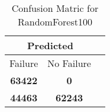 \begin{table}[] 
\caption{Confusion Matric for RandomForest100} 
\label{Table: Prediction Accuracy-NoneRandomForest100RandomForest100EKF-ignoresolarPanelDipole100.9EKF-top2-solarPanelDipole} 
\centering 
\begin{tabular} 
 {@{}ccc@{}} 
\toprule 
\multicolumn{2}{c}{\textbf{Predicted}}
 \\ \midrule 
\multicolumn{1}{|c|}{Failure} & 
\multicolumn{1}{c|}{No Failure}
 \\ \midrule 
\multicolumn{1}{|c|}{\color{green}\textbf{63422}} & 
\multicolumn{1}{c|}{\color{red}\textbf{0}}
 \\ \midrule 
\multicolumn{1}{|c|}{\color{red}\textbf{44463}} & 
\multicolumn{1}{c|}{\color{green}\textbf{62243}}
 \\ \bottomrule 
\end{tabular} 
\end{table} 
